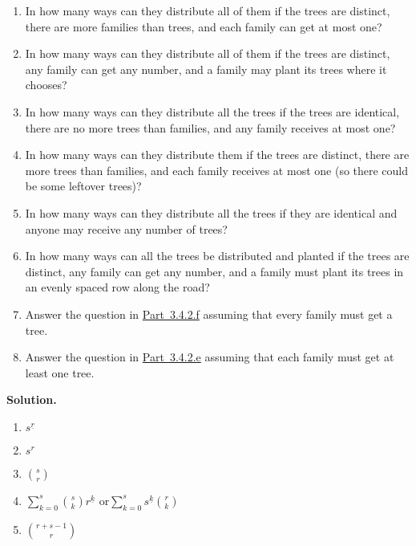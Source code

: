 \documentclass[10pt,]{book}
\theoremstyle{plain}
\theoremstyle{definition}
\theoremstyle{definition}
\numberwithin{equation}{chapter}
\begin{document}
\begin{exerciselist}
\begin{enumerate}[label=(\alph*)]
\item\hypertarget{li-54}{}In how many ways can they distribute all of them if the trees are distinct, there are more families than trees, and each family can get at most one?%
\item\hypertarget{li-55}{}In how many ways can they distribute all of them if the trees are distinct, any family can get any number, and a family may plant its trees where it chooses?%
\item\hypertarget{li-56}{}In how many ways can they distribute all the trees if the trees are identical, there are no more trees than families,   and any family receives at most one?%
\item\hypertarget{li-57}{}In how many ways can they distribute them if the trees are distinct, there are more trees than families, and each family receives at most one (so there could be some leftover trees)?%
\item\hypertarget{multisetproblem}{}In how many ways can they distribute all the trees if they are identical and anyone may receive any number of trees?%
\item\hypertarget{orderedfunctionproblem}{}In how many ways can all the trees be distributed and planted if the trees are distinct, any family can get any number, and a family must plant its trees in an evenly spaced row along the road?%
\item\hypertarget{li-60}{}Answer the question in \hyperlink{orderedfunctionproblem}{Part~3.4.2.f} assuming that every family must get a tree.%
\item\hypertarget{li-61}{}Answer the question in \hyperlink{multisetproblem}{Part~3.4.2.e} assuming that each family must get at least one tree.%
\end{enumerate}
%
\par\smallskip
\par\smallskip
\noindent\textbf{Solution.}\hypertarget{solution-270}{}\quad
\leavevmode%
\begin{enumerate}[label=(\alph*)]
\item\hypertarget{li-62}{}\(s^{\underline{r}}\)%
\item\hypertarget{li-63}{}\(s^r\)%
\item\hypertarget{li-64}{}\(\binom{s}{r}\)%
\item\hypertarget{li-65}{}\(\sum_{k=0}^s \binom{s}{k}r^{\underline{k}}\) or\(\sum_{k=0}^s s^{\underline{k}}\binom{r}{k}\)%
\item\hypertarget{li-66}{}\(\binom{r+s-1}{r}\)%

\end{enumerate}
\end{exerciselist}
\end{document}
